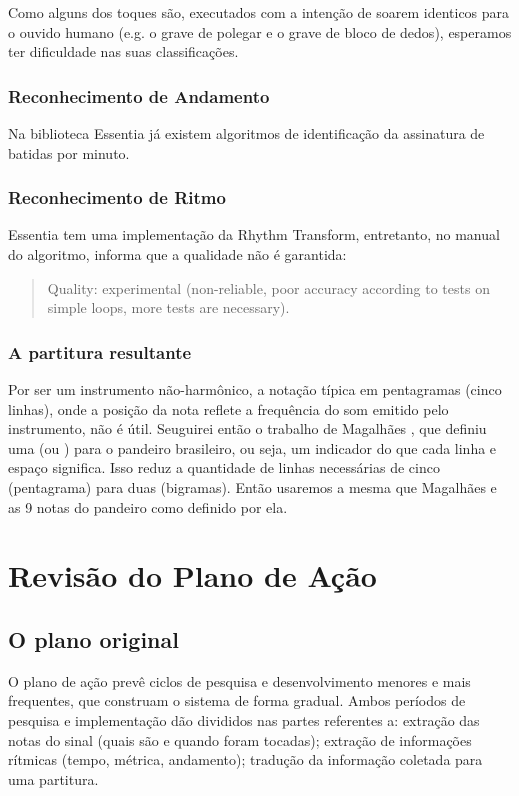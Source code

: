 \documentclass[
  dissertacao,
  brazil
]{ThesisPUC}
\begin{document}
Como alguns dos toques são, executados com a intenção de soarem identicos para o ouvido humano (e.g. o grave de polegar e o grave de bloco de dedos), esperamos ter dificuldade nas suas classificações.

\subsection{Reconhecimento de Andamento}
Na biblioteca Essentia já existem algoritmos de identificação da assinatura de batidas por minuto.

\subsection{Reconhecimento de Ritmo}
Essentia tem uma implementação da Rhythm Transform, entretanto, no manual do algoritmo, informa que a qualidade não é garantida:
\begin{quote}
    Quality: experimental (non-reliable, poor accuracy according to tests on simple loops, more tests are necessary).
\end{quote}

\subsection{A partitura resultante}
Por ser um instrumento não-harmônico, a notação típica em pentagramas (cinco linhas), onde a posição da nota reflete a frequência do som emitido pelo instrumento, não é útil. Seuguirei então o trabalho de Magalhães \cite{magalhaes2018tecnica}, que definiu uma \CA (ou \ca) para o pandeiro brasileiro, ou seja, um indicador do que cada linha e espaço significa. Isso reduz a quantidade de linhas necessárias de cinco (pentagrama) para duas (bigramas). Então usaremos a mesma \ca que Magalhães e as 9 notas do pandeiro como definido por ela.


\chapter{Revisão do Plano de Ação}
\section{O plano original}
O plano de ação prevê ciclos de pesquisa e desenvolvimento menores e mais frequentes, que construam o sistema de forma gradual.
Ambos períodos de pesquisa e implementação dão divididos nas partes referentes a: extração das notas do sinal (quais são e quando foram tocadas); extração de informações rítmicas (tempo, métrica, andamento); tradução da informação coletada para uma partitura.
\end{document}
